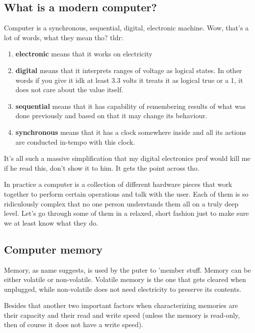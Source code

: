 \documentclass[../ops.tex]{subfiles}
\begin{document}
        \subsection{What is a modern computer?}
        Computer is a synchronous, sequential, digital, electronic machine. Wow,
        that's a lot of words, what they mean tho? tldr:
        \begin{enumerate}
                \item {\bf electronic} means that it works on electricity
                \item {\bf digital} means that it interprets ranges of voltage
                        as logical states. In other words if you give it idk at
                        least 3.3 volts it treats it as logical true or a 1, it
                        does not care about the value itself.
                \item {\bf sequential} means that it has capability of
                        remembering results of what was done previously and
                        based on that it may change its behaviour.
                \item {\bf synchronous} means that it has a clock somewhere
                        inside and all its actions are conducted in-tempo with
                        this clock.
        \end{enumerate}
        It's all such a massive simplification that my digital electronics prof
        would kill me if he read this, don't show it to him. It gets the point
        across tho.

        In practice a computer is a collection of different hardware pieces that
        work together to perform certain operations and talk with the user. Each
        of them is so ridiculously complex that no one person understands them
        all on a truly deep level. Let's go through some of them in a relaxed,
        short fashion just to make sure we at least know what they do.

        \subsection{Computer memory}
        Memory, as name suggests, is used by the puter to 'member stuff. Memory
        can be either volatile or non-volatile. Volatile memory is the one that
        gets cleared when unplugged, while non-volatile does not need
        electricity to preserve its contents.

        Besides that another two important factors when characterizing memories
        are their capacity and their read and write speed (unless the memory
        is read-only, then of course it does not have a write speed).
\end{document}
